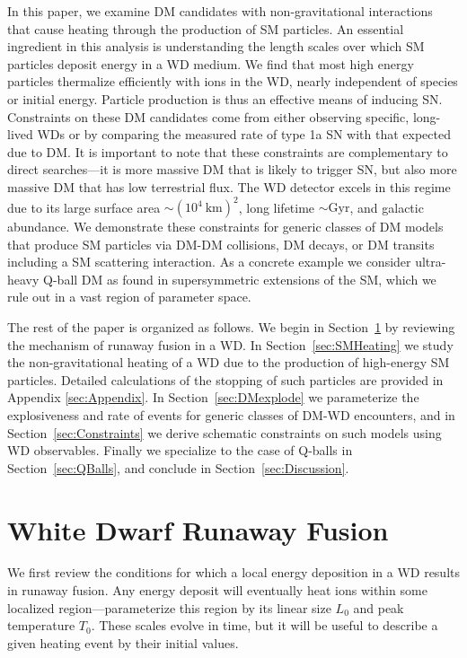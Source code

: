\documentclass[twocolumn, preprintnumbers,amsmath,amssymb,prd, superscriptaddress]{revtex4}
\begin{document}
In this paper, we examine DM candidates with non-gravitational interactions that cause heating through the production of SM particles.
An essential ingredient in this analysis is understanding the length scales over which SM particles deposit energy in a WD medium.
We find that most high energy particles thermalize efficiently with ions in the WD, nearly independent of species or initial energy.
Particle production is thus an effective means of inducing SN.
Constraints on these DM candidates come from either observing specific, long-lived WDs or by comparing the measured rate of type 1a SN with that expected due to DM.
It is important to note that these constraints are complementary to direct searches---it is more massive DM that is likely to trigger SN, but also more massive DM that has low terrestrial flux.
The WD detector excels in this regime due to its large surface area $\sim (10^4 ~\text{km})^2$, long lifetime $\sim \text{Gyr}$, and galactic abundance.
We demonstrate these constraints for generic classes of DM models that produce SM particles via DM-DM collisions, DM decays, or DM transits including a SM scattering interaction.
As a concrete example we consider ultra-heavy Q-ball DM as found in supersymmetric extensions of the SM, which we rule out in a vast region of parameter space.

The rest of the paper is organized as follows.
We begin in Section~\ref{sec:Review} by reviewing the mechanism of runaway fusion in a WD.
In Section~\ref{sec:SMHeating} we study the non-gravitational heating of a WD due to the production of high-energy SM particles.
Detailed calculations of the stopping of such particles are provided in Appendix \ref{sec:Appendix}.
In Section~\ref{sec:DMexplode} we parameterize the explosiveness and rate of events for generic classes of DM-WD encounters, and in Section~\ref{sec:Constraints} we derive schematic constraints on such models using WD observables.
Finally we specialize to the case of Q-balls in Section~\ref{sec:QBalls}, and conclude in Section~\ref{sec:Discussion}.

\section{White Dwarf Runaway Fusion}
\label{sec:Review}

We first review the conditions for which a local energy deposition in a WD results in runaway fusion.
Any energy deposit will eventually heat ions within some localized region---parameterize this region by its linear size $L_0$ and peak temperature $T_0$.
These scales evolve in time, but it will be useful to describe a given heating event by their initial values.
\end{document}
